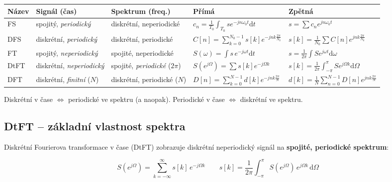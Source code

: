 \documentclass[12pt,a4paper]{article}
\newcommand{\dd}{\mathrm{d}}
\begin{document}
\begin{center}
\begin{tabular}{lllll}
\toprule
\textbf{Název} & \textbf{Signál (čas)} & \textbf{Spektrum (freq.)} & \textbf{Přímá} & \textbf{Zpětná} \\
\midrule
FS  & spojitý, \emph{periodický} & diskrétní, neperiodické & $c_n = \frac{1}{T_0}\int_{T_0}s e^{-jn\omega_0 t}\dd t$ & $s = \sum c_n e^{jn\omega_0 t}$ \\[4pt]
DFS & diskrétní, \emph{periodický} & diskrétní, periodické & $C[n]=\sum_{k=0}^{N_0-1}s[k]e^{-jnk\frac{2\pi}{N_0}}$ & $s[k]=\frac{1}{N_0}\sum C[n]e^{jnk\frac{2\pi}{N_0}}$\\[4pt]
FT  & spojitý, \emph{neperiodický} & spojité, neperiodické & $S(\omega)=\int s\, e^{-j\omega t}\dd t$ & $s=\frac{1}{2\pi}\int S e^{j\omega t}\dd\omega$ \\[4pt]
DtFT& diskrétní, \emph{neperiodický} & spojité, \emph{periodické} ($2\pi$) & $S(e^{j\Omega})=\sum s[k]e^{-j\Omega k}$ & $s[k]=\frac{1}{2\pi}\int_{-\pi}^{\pi}S e^{j\Omega k}\dd\Omega$ \\[4pt]
DFT & diskrétní, \emph{finitní} ($N$) & diskrétní, periodické ($N$) & $D[n]=\sum_{k=0}^{N-1}d[k]e^{-jnk\frac{2\pi}{N}}$ & $d[k]=\frac{1}{N}\sum_{n=0}^{N-1}D[n]e^{jnk\frac{2\pi}{N}}$ \\
\bottomrule
\end{tabular}
\end{center}

\begin{noteBox}
Diskrétní v čase $\Leftrightarrow$ periodické ve spektru (a naopak). Periodické v čase $\Leftrightarrow$ diskrétní ve spektru.
\end{noteBox}

\begin{hvezdBox}
\subsection*{DtFT – základní vlastnost spektra}
\end{hvezdBox}

Diskrétní Fourierova transformace v čase (DtFT) zobrazuje diskrétní neperiodický signál na \textbf{spojité, periodické spektrum}:

\begin{matBox}
\[
  S(e^{j\Omega}) = \sum_{k=-\infty}^{\infty} s[k]\, e^{-j\Omega k}
  \qquad
  s[k] = \frac{1}{2\pi}\int_{-\pi}^{\pi} S(e^{j\Omega})\, e^{j\Omega k}\,\dd\Omega
\]
\end{matBox}
\end{document}
